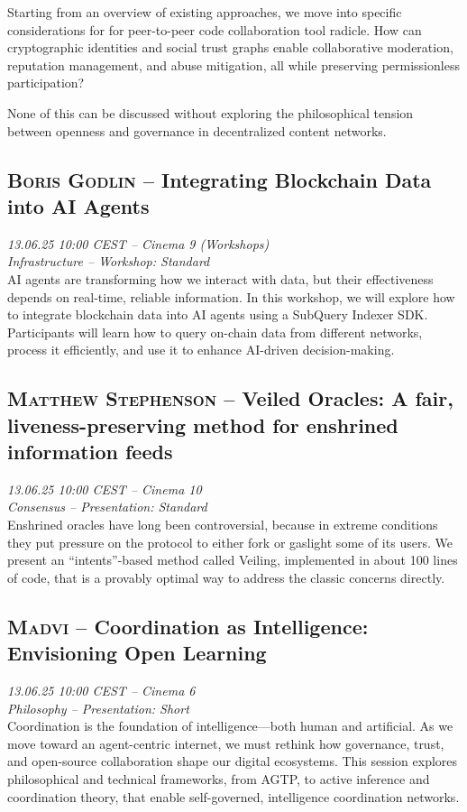 Starting from an overview of existing approaches, we move into specific considerations for for peer-to-peer code collaboration tool radicle. How can cryptographic identities and social trust graphs enable collaborative moderation, reputation management, and abuse mitigation, all while preserving permissionless participation?

None of this can be discussed without  exploring the philosophical tension between openness and governance in decentralized content networks.

\clearpage
\subsection {\textsc{Boris Godlin}  -- Integrating Blockchain Data into AI Agents} \noindent \textit {13.06.25 10:00 CEST -- Cinema 9 (Workshops)\\ Infrastructure -- Workshop: Standard}\\[1em] AI agents are transforming how we interact with data, but their effectiveness depends on real-time, reliable information. In this workshop, we will explore how to integrate blockchain data into AI agents using a SubQuery Indexer SDK. Participants will learn how to query on-chain data from different networks, process it efficiently, and use it to enhance AI-driven decision-making.

\clearpage
\subsection {\textsc{Matthew Stephenson}  -- Veiled Oracles: A fair, liveness-preserving method for enshrined information feeds} \noindent \textit {13.06.25 10:00 CEST -- Cinema 10\\ Consensus -- Presentation: Standard}\\[1em] Enshrined oracles have long been controversial, because in extreme conditions they put pressure on the protocol to either fork or gaslight some of its users. We present an ``intents''-based method called Veiling, implemented in about 100 lines of code, that is a provably optimal way to address the classic concerns directly.

\clearpage
\subsection {\textsc{Madvi}  -- Coordination as Intelligence: Envisioning Open Learning} \noindent \textit {13.06.25 10:00 CEST -- Cinema 6\\ Philosophy -- Presentation: Short}\\[1em] Coordination is the foundation of intelligence—both human and artificial. As we move toward an agent-centric internet, we must rethink how governance, trust, and open-source collaboration shape our digital ecosystems. This session explores philosophical and technical frameworks, from AGTP, to active inference and coordination theory, that enable self-governed, intelligence coordination networks.

